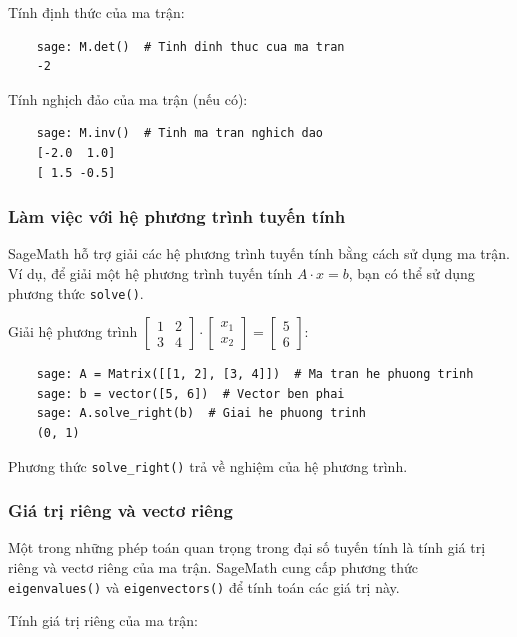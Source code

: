 Tính định thức của ma trận:

\begin{lstlisting}
	sage: M.det()  # Tinh dinh thuc cua ma tran
	-2
\end{lstlisting}

Tính nghịch đảo của ma trận (nếu có):

\begin{lstlisting}
	sage: M.inv()  # Tinh ma tran nghich dao
	[-2.0  1.0]
	[ 1.5 -0.5]
\end{lstlisting}

\subsubsection{Làm việc với hệ phương trình tuyến tính}

SageMath hỗ trợ giải các hệ phương trình tuyến tính bằng cách sử dụng ma trận. Ví dụ, để giải một hệ phương trình tuyến tính \(A \cdot x = b\), bạn có thể sử dụng phương thức \texttt{solve()}.

Giải hệ phương trình \( \begin{bmatrix} 1 & 2 \\ 3 & 4 \end{bmatrix} \cdot \begin{bmatrix} x_1 \\ x_2 \end{bmatrix} = \begin{bmatrix} 5 \\ 6 \end{bmatrix} \):

\begin{lstlisting}
	sage: A = Matrix([[1, 2], [3, 4]])  # Ma tran he phuong trinh
	sage: b = vector([5, 6])  # Vector ben phai
	sage: A.solve_right(b)  # Giai he phuong trinh
	(0, 1)
\end{lstlisting}

Phương thức \texttt{solve\_right()} trả về nghiệm của hệ phương trình.

\subsubsection{Giá trị riêng và vectơ riêng}

Một trong những phép toán quan trọng trong đại số tuyến tính là tính giá trị riêng và vectơ riêng của ma trận. SageMath cung cấp phương thức \texttt{eigenvalues()} và \texttt{eigenvectors()} để tính toán các giá trị này.

Tính giá trị riêng của ma trận:

